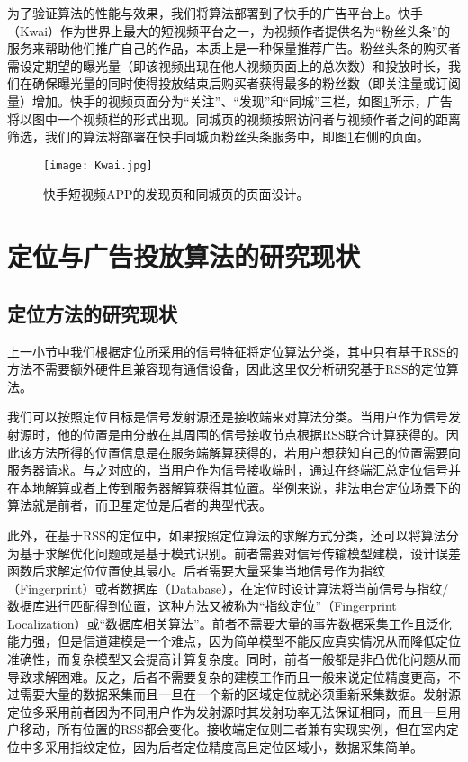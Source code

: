 为了验证算法的性能与效果，我们将算法部署到了快手的广告平台上。快手（Kwai）作为世界上最大的短视频平台之一，为视频作者提供名为“粉丝头条”的服务来帮助他们推广自己的作品，本质上是一种保量推荐广告。粉丝头条的购买者需设定期望的曝光量（即该视频出现在他人视频页面上的总次数）和投放时长，我们在确保曝光量的同时使得投放结束后购买者获得最多的粉丝数（即关注量或订阅量）增加。快手的视频页面分为“关注”、“发现”和“同城”三栏，如图\ref{fig:kwai}所示，广告将以图中一个视频栏的形式出现。同城页的视频按照访问者与视频作者之间的距离筛选，我们的算法将部署在快手同城页粉丝头条服务中，即图\ref{fig:kwai}右侧的页面。

\begin{figure}[htb]
	\centering
	\texttt{[image: Kwai.jpg]}
	\caption{快手短视频APP的发现页和同城页的页面设计。}
	\label{fig:kwai}
\end{figure}

\section{定位与广告投放算法的研究现状}
\label{sec:first}

\subsection{定位方法的研究现状}

上一小节中我们根据定位所采用的信号特征将定位算法分类，其中只有基于RSS的方法不需要额外硬件且兼容现有通信设备，因此这里仅分析研究基于RSS的定位算法。

我们可以按照定位目标是信号发射源还是接收端来对算法分类。当用户作为信号发射源时，他的位置是由分散在其周围的信号接收节点根据RSS联合计算获得的。因此该方法所得的位置信息是在服务端解算获得的，若用户想获知自己的位置需要向服务器请求。与之对应的，当用户作为信号接收端时，通过在终端汇总定位信号并在本地解算或者上传到服务器解算获得其位置。举例来说，非法电台定位场景下的算法就是前者，而卫星定位是后者的典型代表。

此外，在基于RSS的定位中，如果按照定位算法的求解方式分类，还可以将算法分为基于求解优化问题或是基于模式识别。前者需要对信号传输模型建模，设计误差函数后求解定位位置使其最小。后者需要大量采集当地信号作为指纹（Fingerprint）或者数据库（Database），在定位时设计算法将当前信号与指纹/数据库进行匹配得到位置，这种方法又被称为“指纹定位”（Fingerprint Localization）或“数据库相关算法”。前者不需要大量的事先数据采集工作且泛化能力强，但是信道建模是一个难点，因为简单模型不能反应真实情况从而降低定位准确性，而复杂模型又会提高计算复杂度。同时，前者一般都是非凸优化问题从而导致求解困难。反之，后者不需要复杂的建模工作而且一般来说定位精度更高，不过需要大量的数据采集而且一旦在一个新的区域定位就必须重新采集数据。发射源定位多采用前者因为不同用户作为发射源时其发射功率无法保证相同，而且一旦用户移动，所有位置的RSS都会变化。接收端定位则二者兼有实现实例，但在室内定位中多采用指纹定位，因为后者定位精度高且定位区域小，数据采集简单。

